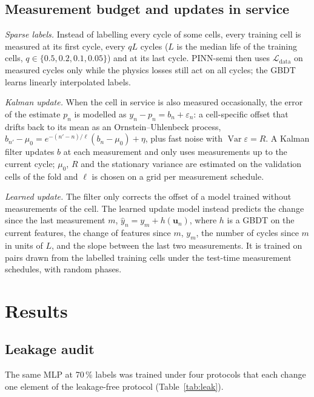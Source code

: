 \documentclass[11pt,a4paper]{article}
\newcommand{\Lc}{\mathcal{L}}
\begin{document}
\subsection{Measurement budget and updates in service}\label{sec:budgetmethods}
\emph{Sparse labels.} Instead of labelling every cycle of some cells, every training cell is measured at its first
cycle, every $qL$ cycles ($L$ is the median life of the training cells, $q \in \{0.5, 0.2, 0.1, 0.05\}$) and at its
last cycle. PINN-semi then uses $\Lc_\text{data}$ on measured cycles only while the physics losses still act on all
cycles; the GBDT learns linearly interpolated labels.

\emph{Kalman update.} When the cell in service is also measured occasionally, the error of the estimate $p_n$ is
modelled as $y_n - p_n = b_n + \varepsilon_n$: a cell-specific offset that drifts back to its mean as an
Ornstein--Uhlenbeck process, $b_{n'} - \mu_0 = e^{-(n'-n)/\ell}(b_n - \mu_0) + \eta$, plus fast noise with
$\operatorname{Var}\varepsilon = R$. A Kalman filter updates $b$ at each measurement and only uses measurements up to
the current cycle; $\mu_0$, $R$ and the stationary variance are estimated on the validation cells of the
fold and $\ell$ is chosen on a grid per measurement schedule.

\emph{Learned update.} The filter only corrects the offset of a model trained without measurements of the cell. The
learned update model instead predicts the change since the last measurement $m$, $\hat y_n = y_m + h(\mathbf{u}_n)$,
where $h$ is a GBDT on the current features, the change of features since $m$, $y_m$, the number of cycles since $m$
in units of $L$, and the slope between the last two measurements. It is trained on pairs drawn from the labelled
training cells under the test-time measurement schedules, with random phases.

\section{Results}\label{sec:results}

\subsection{Leakage audit}\label{sec:leak}
The same MLP at 70\,\% labels was trained under four protocols that each change one element of the leakage-free
protocol (Table~\ref{tab:leak}). \LeakText


\end{document}
